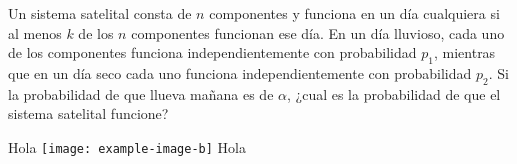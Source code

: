 \question%
	Un sistema satelital consta de $n$ componentes y funciona en un día cualquiera si al menos $k$ de los $n$ componentes funcionan ese día. En un día lluvioso, cada uno de los componentes funciona independientemente con probabilidad $p_1$, mientras que en un día seco cada uno funciona independientemente con probabilidad $p_2$. Si la probabilidad de que llueva mañana es de $\alpha$, ¿cual es la probabilidad de que el sistema satelital funcione?
	\begin{solutionorlines}
		Hola
		\texttt{[image: example-image-b]}
		\centering
		\label{fig:2}
		\justifying
		Hola
	\end{solutionorlines}